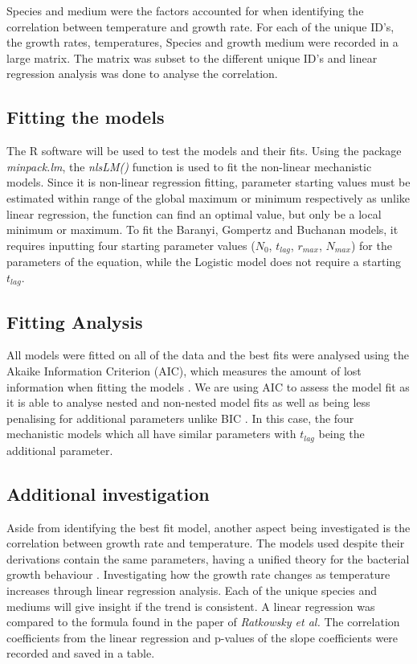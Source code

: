 \documentclass[11pt]{article}
\begin{document}
Species and medium were the factors accounted for when identifying the correlation between temperature and growth rate. For each of the unique ID’s, the growth rates, temperatures, Species and growth medium were recorded in a large matrix. The matrix was subset to the different unique ID’s and linear regression analysis was done to analyse the correlation.

\subsection{Fitting the models}

The R software will be used to test the models and their fits. Using the package \textit{minpack.lm}, the \textit{nlsLM()} function is used to fit the non-linear mechanistic models. Since it is non-linear regression fitting, parameter starting values must be estimated within range of the global maximum or minimum respectively as unlike linear regression, the function can find an optimal value, but only be a local minimum or maximum. To fit the Baranyi, Gompertz and Buchanan models, it requires inputting four starting parameter values ($N_0$, $t_{lag}$, $r_{max}$, $N_{max}$) for the parameters of the equation, while the Logistic model does not require a starting $t_{lag}$.

\subsection{Fitting Analysis}

All models were fitted on all of the data and the best fits were analysed using the Akaike Information Criterion (AIC), which measures the amount of lost information when fitting the models \cite{posada2004model}. We are using AIC to assess the model fit as it is able to analyse nested and non-nested model fits as well as being less penalising for additional parameters unlike BIC \cite{posada2004model}. In this case, the four mechanistic models which all have similar parameters with $t_{lag}$ being the additional parameter.

\subsection{Additional investigation}

Aside from identifying the best fit model, another aspect being investigated is the correlation between growth rate and temperature. The models used despite their derivations contain the same parameters, having a unified theory for the bacterial growth behaviour \cite{levins1966strategy}. Investigating how the growth rate changes as temperature increases through linear regression analysis. Each of the unique species and mediums will give insight if the trend is consistent. A linear regression was compared to the formula found in the paper of \textit{Ratkowsky et al.} The correlation coefficients from the linear regression and p-values of the slope coefficients were recorded and saved in a table.
\end{document}

